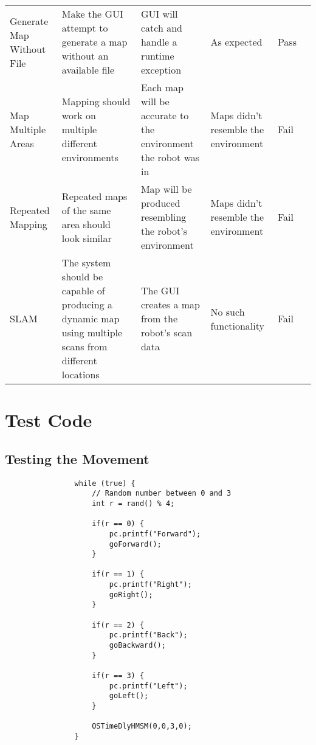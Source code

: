 \begin{landscape}
\begin{table}[h!]
\begin{tabular}{| p{2.5cm} | p{5cm} | p{4cm} | p{4cm} | p{1.5cm} | p{2cm} |}
						Generate Map Without File & Make the GUI attempt to generate a map without an available file & GUI will catch and handle a runtime exception & As expected & Pass &  \\ 
						
						Map Multiple Areas & Mapping should work on multiple different environments & Each map will be accurate to the environment the robot was in & Maps didn't resemble the environment & Fail &  \\ 
						
						Repeated Mapping & Repeated maps of the same area should look similar & Map will be produced resembling the robot's environment & Maps didn't resemble the environment & Fail &  \\ 
						
						SLAM & The system should be capable of producing a dynamic map using multiple scans from different locations & The GUI creates a map from the robot's scan data & No such functionality & Fail &  \\ [1ex] 
						\hline
					\end{tabular}	
				\end{table}
			\end{landscape}

		\section{Test Code}
		\label{testing:testcode}
			\subsection{Testing the Movement}
			\label{testcode:movementbasic}
			\begin{lstlisting}
				while (true) {
					// Random number between 0 and 3
					int r = rand() % 4;
					
					if(r == 0) {
						pc.printf("Forward");
						goForward();
					}
					
					if(r == 1) {
						pc.printf("Right");
						goRight();
					}
					
					if(r == 2) {
						pc.printf("Back");
						goBackward();
					}
					
					if(r == 3) {
						pc.printf("Left");
						goLeft();
					}

					OSTimeDlyHMSM(0,0,3,0);
				}
			\end{lstlisting}
			
